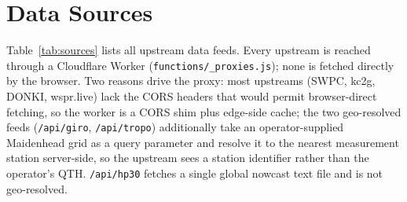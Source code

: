 \documentclass[11pt,a4paper]{article}
\begin{document}
\section{Data Sources}\label{sec:data}

Table~\ref{tab:sources} lists all upstream data feeds.  Every
upstream is reached through a Cloudflare Worker
(\texttt{functions/\_proxies.js}); none is fetched directly by the
browser.  Two reasons drive the proxy: most upstreams (SWPC, kc2g,
DONKI, wspr.live) lack the CORS headers that would permit
browser-direct fetching, so the worker is a CORS shim plus
edge-side cache; the two geo-resolved feeds
(\texttt{/api/giro}, \texttt{/api/tropo}) additionally take an
operator-supplied Maidenhead grid as a query parameter and
resolve it to the nearest measurement station server-side, so
the upstream sees a station identifier rather than the
operator's QTH.  \texttt{/api/hp30} fetches a single global
nowcast text file and is not geo-resolved.
\end{document}
